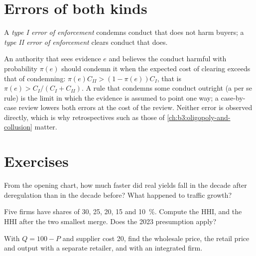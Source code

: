 \section{Errors of both kinds}\label{sec:b3:competition-policy:errors}

\begin{definition}\label{def:b3:competition-policy:errors}
A \emph{type I error of enforcement} condemns conduct that does not harm buyers; a
\emph{type II error of enforcement} clears conduct that does.
\end{definition}

An authority that sees evidence $e$ and believes the conduct harmful with probability
$\pi(e)$ should condemn it when the expected cost of clearing exceeds that of condemning:
$\pi(e)C_{II} > (1 - \pi(e))C_I$, that is $\pi(e) > C_I/(C_I + C_{II})$. A rule that condemns some conduct outright (a
per se rule) is the limit in which the evidence is assumed to point one way; a
case-by-case review lowers both errors at the cost of the review. Neither error is
observed directly, which is why retrospectives such as those of
\cref{ch:b3:oligopoly-and-collusion} matter.

\section{Exercises}\label{sec:b3:competition-policy:exercises}

\begin{exercise}[$\star$]\label{exo:b3:competition-policy:1}
From the opening chart, how much faster did real yields fall in the decade after
deregulation than in the decade before? What happened to traffic growth?
\end{exercise}

\begin{exercise}[$\star$]\label{exo:b3:competition-policy:2}
Five firms have shares of 30, 25, 20, 15 and 10~\%. Compute the HHI, and the HHI after the two
smallest merge. Does the 2023 presumption apply?
\end{exercise}

\begin{exercise}[$\star$]\label{exo:b3:competition-policy:3}
With $Q = 100 - P$ and supplier cost 20, find the wholesale price, the retail price and output with a
separate retailer, and with an integrated firm.
\end{exercise}

